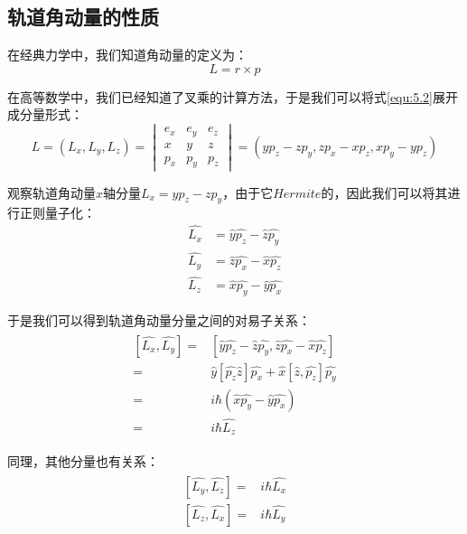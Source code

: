     \subsection{轨道角动量的性质}
    在经典力学中，我们知道角动量的定义为：
    \begin{equation}\label{equ:5.2}
    L=r\times p
    \end{equation}

    在高等数学中，我们已经知道了叉乘的计算方法，于是我们可以将式\ref{equ:5.2}展开成分量形式：
    \begin{equation}
        L=(L_x,L_y,L_z)=
        \begin{vmatrix}
        e_x & e_y & e_z\\
        x & y & z\\
        p_x & p_y & p_z
        \end{vmatrix}
         =(yp_z-zp_y,zp_x-xp_z,xp_y-yp_z)
    \end{equation}

    观察轨道角动量$x$轴分量$L_x=yp_z-zp_y$，由于它$Hermite$的，因此我们可以将其进行正则量子化：
    \begin{equation}
        \begin{split}
            \hat{L_x}&=\hat{y}\hat{p_z}-\hat{z}\hat{p_y}\\
            \hat{L_y}&=\hat{z}\hat{p_x}-\hat{x}\hat{p_z}\\
            \hat{L_z}&=\hat{x}\hat{p_y}-\hat{y}\hat{p_x}
     \end{split}
    \end{equation}
   
    于是我们可以得到轨道角动量分量之间的对易子关系：
    \begin{align}
        \begin{split}
            [ \hat{L_x},\hat{L_y} ] =&[\hat{y}\hat{p_z}-\hat{z}\hat{p_y},\hat{z}\hat{p_x}-\hat{x}\hat{p_z}] \\
            =&\hat{y}[\hat{p_z}\hat{z}]\hat{p_x}+\hat{x}[\hat{z},\hat{p_z}]\hat{p_y}\\
            =& i\hbar(\hat{x}\hat{p_y}-\hat{y}\hat{p_x})\\
            =& i\hbar \hat{L_z}
        \end{split} 
    \end{align}
       
    同理，其他分量也有关系：
    \begin{align}
        \begin{split}
            [ \hat{L_y},\hat{L_z} ] =& i\hbar \hat{L_x}\\
            [ \hat{L_z},\hat{L_x} ] =& i\hbar \hat{L_y}
        \end{split}
    \end{align}
       
